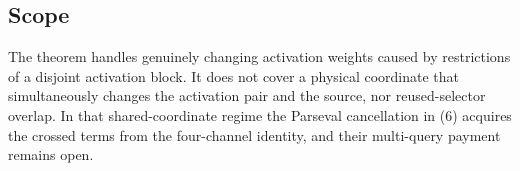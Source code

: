 \subsection*{Scope}

The theorem handles genuinely changing activation weights caused by
restrictions of a disjoint activation block.  It does not cover a physical
coordinate that simultaneously changes the activation pair and the source,
nor reused-selector overlap.  In that shared-coordinate regime the
Parseval cancellation in (6) acquires the crossed terms from the four-channel
identity, and their multi-query payment remains open.

